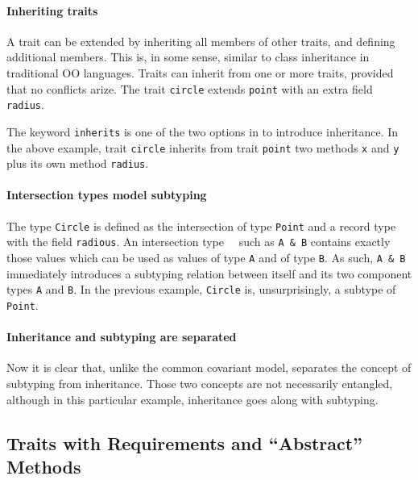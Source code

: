 \paragraph{Inheriting traits}
A trait can be extended by inheriting all members of
other traits, and defining additional members. This is, in some sense, similar
to class inheritance in traditional OO languages. Traits can inherit
from one or more traits, provided that
no conflicts arize. The trait \lstinline$circle$ extends
\lstinline{point} with an extra field \lstinline{radius}.

The keyword \lstinline{inherits} is one of the two options in \name to introduce
inheritance. In the above example, trait \lstinline{circle} inherits from trait
\lstinline{point} two methods \lstinline{x} and \lstinline{y} plus its own
method \lstinline{radius}.

\paragraph{Intersection types model subtyping}
The type \lstinline{Circle} is defined as the intersection of type
\lstinline{Point} and a record type with the field
\lstinline{radious}. An intersection
type~\cite{dunfield2014elaborating}~ such as \lstinline{A & B} contains exactly
those values which can be used as values of type \lstinline{A} and of type
\lstinline{B}. As such, \lstinline{A & B} immediately introduces a subtyping
relation between itself and its two component types \lstinline{A} and
\lstinline{B}. In the previous example, \lstinline{Circle} is, unsurprisingly, a subtype of
\lstinline{Point}.

\paragraph{Inheritance and subtyping are separated}
Now it is clear that, unlike the common covariant
model, \name separates the concept of subtyping from inheritance. Those two
concepts are not necessarily entangled, although in this particular example,
inheritance goes along with subtyping.

\subsection{Traits with Requirements and ``Abstract'' Methods}

